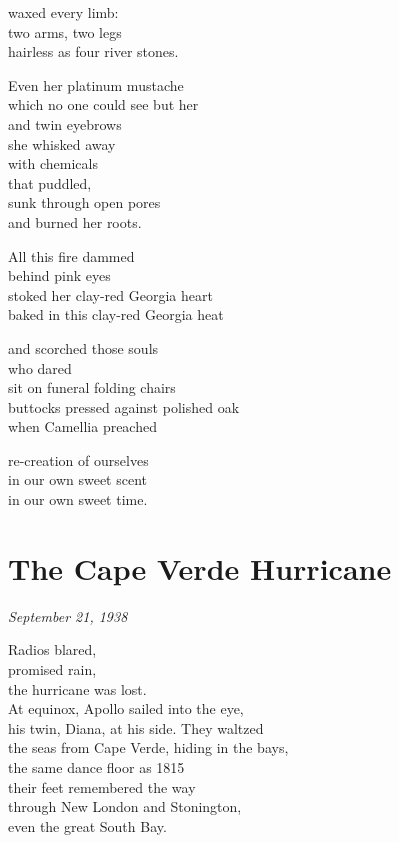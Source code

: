 \documentclass[twoside,10pt]{book}
\begin{document}
waxed every limb:\\
two arms, two legs\\
hairless as four river stones.

Even her platinum mustache\\
which no one could see but her\\
and twin eyebrows\\
she whisked away\\
with chemicals\\
that puddled,\\
sunk through open pores\\
and burned her roots.

All this fire dammed\\
behind pink eyes\\
stoked her clay-red Georgia heart\\
baked in this clay-red Georgia heat

and scorched those souls\\
who dared\\
sit on funeral folding chairs\\
buttocks pressed against polished oak\\
when Camellia preached

re-creation of ourselves\\
in our own sweet scent\\
in our own sweet time.


\clearpage
\section{The Cape Verde Hurricane}

\emph{September 21, 1938}

Radios blared,\\
promised rain,\\
the hurricane was lost.\\
At equinox, Apollo sailed into the eye,\\
his twin, Diana, at his side. They waltzed\\
the seas from Cape Verde, hiding in the bays,\\
the same dance floor as 1815\\
their feet remembered the way\\
through New London and Stonington,\\
even the great South Bay.
\end{document}
